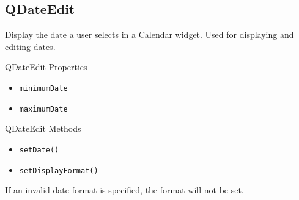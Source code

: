 \documentclass[notes.tex]{subfiles}
\begin{document}
			\subsection{QDateEdit}
				Display the date a user selects in a Calendar widget. Used for displaying and editing dates.
				\begin{sidenote}{QDateEdit Properties}
					\vspace{-0.5cm}
					\begin{multicols}{2}
						\begin{itemize}[nosep]
							\item \verb|minimumDate|
							\item \verb|maximumDate|
						\end{itemize}
					\end{multicols}
				\end{sidenote}
				\begin{sidenote}{QDateEdit Methods}
					\vspace{-0.5cm}
					\begin{multicols}{2}
						\begin{itemize}[nosep]
							\item \verb|setDate()|
							\item \verb|setDisplayFormat()|
						\end{itemize}
					\end{multicols}
					\vspace{-0.5cm}
					If an invalid date format is specified, the format will not be set.
				\end{sidenote}
\end{document}
